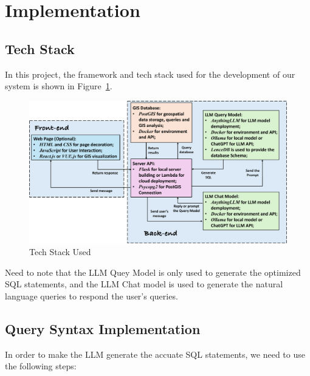\documentclass{article}
\begin{document}
\section{Implementation}



\subsection{Tech Stack}
In this project, the framework and tech stack used for the development of our system is shown in Figure~\ref{fig:techstack}.

\begin{figure}[H]
    \centering
    \includegraphics[width=\textwidth]{figs/techstack.pdf}
    \caption{Tech Stack Used}
    \label{fig:techstack}
\end{figure}

Need to note that the LLM Quey Model is only used to generate the optimized SQL statements, and the LLM Chat model is used to generate the natural language queries to respond the user's queries.

\subsection{Query Syntax Implementation}

In order to make the LLM generate the accuate SQL statements, we need to use the following steps:
\end{document}
